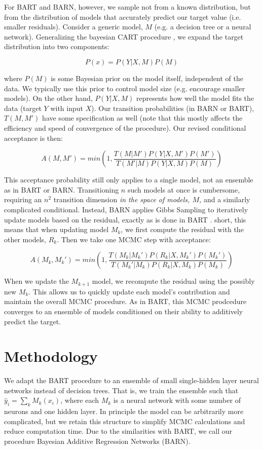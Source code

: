\documentclass[12pt]{article}
\begin{document}
For BART and BARN, however, we sample not from a known distribution, but from the distribution of models that accurately predict our target value (i.e. smaller residuals).  Consider a generic model, $M$ (e.g. a decision tree or a neural network).  Generalizing the bayesian CART procedure \cite{chipman1998bayesian}, we expand the target distribution into two components: 

$$
P(x) = P(Y|X,M) P(M)
$$

where $P(M)$ is some Bayesian prior on the model itself, independent of the data.  We typically use this prior to control model size (e.g. encourage smaller models).  On the other hand, $P(Y|X,M)$ represents how well the model fits the data (target $Y$ with input $X$).  Our transition probabilities (in BARN or BART), $T(M,M')$ have some specification as well (note that this mostly affects the efficiency and speed of convergence of the procedure).  Our revised conditional acceptance is then:

$$
A(M,M') = min(1, \frac{T(M|M') P(Y|X,M')P(M')}{T(M'|M) P(Y|X,M)P(M)})
$$

This acceptance probability still only applies to a single model, not an ensemble as in BART or BARN.  Transitioning $n$ such models at once is cumbersome, requiring an $n^2$ transition dimension \emph{in the space of models, $M$,} and a similarly complicated conditional.  Instead, BARN applies Gibbs Sampling to iteratively update models based on the residual, exactly as is done in BART \cite{chipman2010bart}.  short, this means that when updating model $M_k$, we first compute the residual with the other models, $R_k$.  Then we take one MCMC step with acceptance:

$$
A(M_k,M_k') = min(1, \frac{T(M_k|M_k') P(R_k|X,M_k')P(M_k')}{T(M_k'|M_k) P(R_k|X,M_k)P(M_k)})
$$

When we update the $M_{k+1}$ model, we recompute the residual using the possibly new $M_k$.  This allows us to quickly update each model's contribution and maintain the overall MCMC procedure.  As in BART, this MCMC prodcedure converges to an ensemble of models conditioned on their ability to additively predict the target.

\section{Methodology}\label{sec:method}

We adapt the BART procedure \cite{chipman2010bart} to an ensemble of small single-hidden layer neural networks instead of decision trees.  That is, we train the ensemble such that $\hat{y}_i = \sum_k M_k(x_i)$, where each $M_k$ is a neural network with some number of neurons and one hidden layer.  In principle the model can be arbitrarily more complicated, but we retain this structure to simplify MCMC calculations and reduce computation time.  Due to the similarities with BART, we call our procedure Bayesian Additive Regression Networks (BARN).
\end{document}
